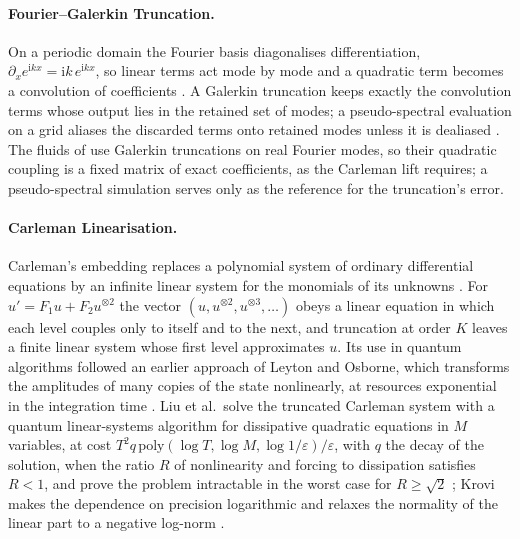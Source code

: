 \paragraph{Fourier--Galerkin Truncation.}
\label{sec:bg-fourier}

On a periodic domain the Fourier basis diagonalises differentiation, $\partial_xe^{\mathrm{i}kx}=\mathrm{i}k\,e^{\mathrm{i}kx}$, so linear terms act mode by mode and a quadratic term becomes a convolution of coefficients \cite{canuto2006spectral}. A Galerkin truncation keeps exactly the convolution terms whose output lies in the retained set of modes; a pseudo-spectral evaluation on a grid aliases the discarded terms onto retained modes unless it is dealiased \cite{canuto2006spectral}. The fluids of  use Galerkin truncations on real Fourier modes, so their quadratic coupling is a fixed matrix of exact coefficients, as the Carleman lift requires; a pseudo-spectral simulation serves only as the reference for the truncation's error.

\paragraph{Carleman Linearisation.}
\label{sec:bg-carleman}

Carleman's embedding replaces a polynomial system of ordinary differential equations by an infinite linear system for the monomials of its unknowns \cite{carleman1932,kowalskisteeb1991}. For $u'=F_1u+F_2u^{\otimes2}$ the vector $(u,u^{\otimes2},u^{\otimes3},\dots)$ obeys a linear equation in which each level couples only to itself and to the next, and truncation at order $K$ leaves a finite linear system whose first level approximates $u$. Its use in quantum algorithms followed an earlier approach of Leyton and Osborne, which transforms the amplitudes of many copies of the state nonlinearly, at resources exponential in the integration time \cite{leyton2008nonlinear}. Liu et al.\ solve the truncated Carleman system with a quantum linear-systems algorithm for dissipative quadratic equations in $M$ variables, at cost $T^2q\,\mathrm{poly}(\log T,\log M,\log1/\varepsilon)/\varepsilon$, with $q$ the decay of the solution, when the ratio $R$ of nonlinearity and forcing to dissipation satisfies $R<1$, and prove the problem intractable in the worst case for $R\ge\sqrt2$ \cite{liu2021carleman}; Krovi makes the dependence on precision logarithmic and relaxes the normality of the linear part to a negative log-norm \cite{krovi2023improved}.

